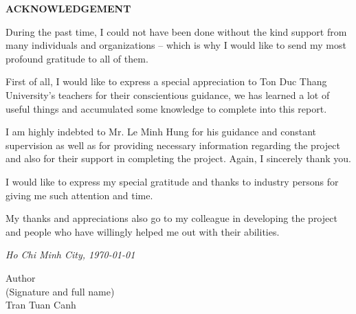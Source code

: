 \newpage	
\vspace{5cm} 

\begin{center}
	{
		\fontsize{16pt}{1}\selectfont
		\textbf{ACKNOWLEDGEMENT}
	}
\end{center} 		
	\noindent
	
	During the past time, I could not have been done without the kind support from many individuals and organizations – which is why I would like to send my most profound gratitude to all of them.
	
	First of all, I would like to express a special appreciation to Ton Duc Thang University’s teachers for their conscientious guidance, we has learned a lot of useful things and accumulated some knowledge to complete into this report. 
	
	I am highly indebted to Mr. Le Minh Hung for his guidance and constant supervision as well as for providing necessary information regarding the project and also for their support in completing the project. Again, I sincerely thank you.
	
	I would like to express my special gratitude and thanks to industry persons for giving me such attention and time.
	
	My thanks and appreciations also go to my colleague in developing the project and people who have willingly helped me out with their abilities.



\vspace{0.15cm}


\begin{flushright}
	{\it Ho Chi Minh City, \today{} }
	
	Author \hskip 2cm\quad
	~\\
	(Signature and full name) \hskip 0.4cm\quad
	~\\[1.5cm] 
	Tran Tuan Canh\hskip 1.5cm\quad
	
	
\end{flushright}
